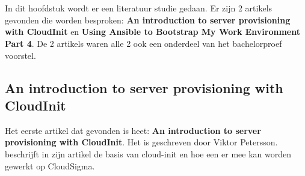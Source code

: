 \chapter{}
\label{ch:stand-van-zaken}







In dit hoofdstuk wordt er een literatuur studie gedaan. Er zijn 2 artikels gevonden die worden besproken: \textbf{An introduction to server provisioning with CloudInit} en \textbf{Using Ansible to Bootstrap My Work Environment Part 4}. De 2 artikels waren alle 2 ook een onderdeel van het bachelorproef voorstel.

\section{An introduction to server provisioning with CloudInit}
Het eerste artikel dat gevonden is heet: \textbf{An introduction to server provisioning with CloudInit}. Het is geschreven door Viktor Petersson. \autocite{viktorpet} beschrijft in zijn artikel de basis van cloud-init en hoe een er mee kan worden gewerkt op CloudSigma. 

